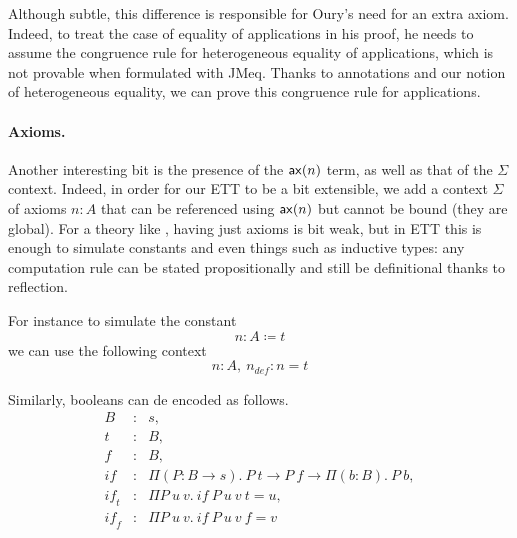 Although subtle, this difference is responsible for Oury's need for an
extra axiom. Indeed, to treat the case of equality of applications in
his proof, he needs to assume the congruence rule for heterogeneous
equality of applications, which is not provable when formulated with
\acrshort{JMeq}. Thanks to annotations and our notion of heterogeneous equality,
we can prove this congruence rule for applications.

\paragraph{Axioms.}

Another interesting bit is the presence of the \(\mathsf{ax}(n)\) term, as well as
that of the \(\Sigma\) context. Indeed, in order for our \acrshort{ETT} to be
a bit extensible, we add a context \(\Sigma\) of axioms \(n : A\) that can be
referenced using \(\mathsf{ax}(n)\) but cannot be bound (they are global).
For a theory like \Coq, having just axioms is bit weak, but in \acrshort{ETT}
this is enough to simulate constants and even things such as inductive types:
any computation rule can be stated propositionally and still be definitional
thanks to reflection.

For instance to simulate the constant
\[
  n : A \coloneqq t
\]
we can use the following context
\[
  n : A,\ n_{\mathit{def}} : n = t
\]

Similarly, booleans can de encoded as follows.
\[
  \begin{array}{lcl}
    B &:& s, \\
    t &:& B, \\
    f &:& B, \\
    \mathit{if} &:& \Pi (P : B \to s).\ P\ t \to P\ f \to \Pi (b : B).\ P\ b, \\
    \mathit{if_t} &:& \Pi P\ u\ v.\ \mathit{if}\ P\ u\ v\ t = u, \\
    \mathit{if_f} &:& \Pi P\ u\ v.\ \mathit{if}\ P\ u\ v\ f = v
  \end{array}
\]

